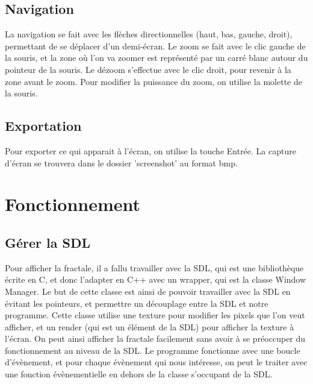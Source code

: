 \documentclass{article}
\begin{document}
	\subsection{Navigation}
	La navigation se fait avec les flèches directionnelles (haut, bas, gauche, droit), permettant de se déplacer d'un demi-écran.
	Le zoom se fait avec le clic gauche de la souris, et la zone où l'on va zoomer est représenté par un carré blanc autour du pointeur de la souris.
	Le dézoom s'effectue avec le clic droit, pour revenir à la zone avant le zoom.
	Pour modifier la puissance du zoom, on utilise la molette de la souris.
	\subsection{Exportation}
	Pour exporter ce qui apparait à l'écran, on utilise la touche Entrée.
	La capture d'écran se trouvera dans le dossier 'screenshot' au format bmp.
	\section{Fonctionnement}
	\subsection{Gérer la SDL}
	Pour afficher la fractale, il a fallu travailler avec la SDL, qui est une bibliothèque écrite en C, et donc l'adapter en C++ avec un wrapper, qui est la classe Window Manager.
	Le but de cette classe est ainsi de pouvoir travailler avec la SDL en évitant les pointeurs, et permettre un découplage entre la SDL et notre programme.
	Cette classe utilise une texture pour modifier les pixels que l'on veut afficher, et un render (qui est un élément de la SDL) pour afficher la texture à l'écran.
	On peut ainsi afficher la fractale facilement sans avoir à se préoccuper du fonctionnement au niveau de la SDL.
	Le programme fonctionne avec une boucle d'évènement, et pour chaque évènement qui nous intéresse, on peut le traiter avec une fonction évènementielle en dehors de la classe s'occupant de la SDL.
\end{document}
